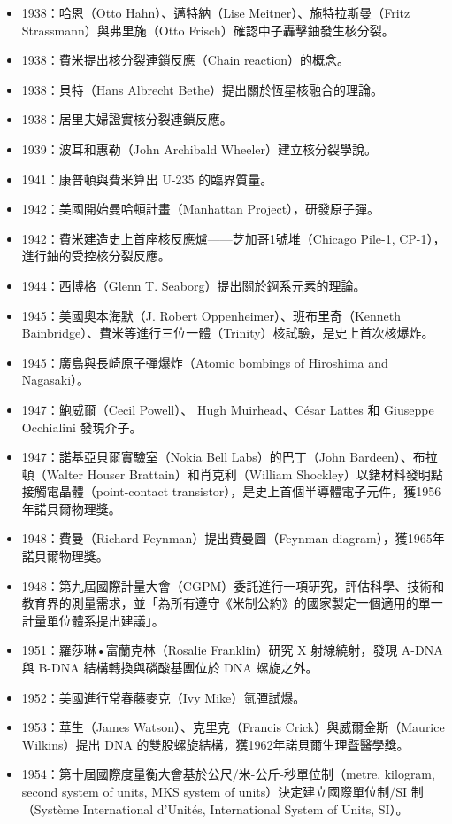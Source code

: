 \documentclass[a4paper,12pt]{article}
\begin{document}
\begin{itemize}
\item 1938：哈恩（Otto Hahn）、邁特納（Lise Meitner）、施特拉斯曼（Fritz Strassmann）與弗里施（Otto Frisch）確認中子轟擊鈾發生核分裂。
\item 1938：費米提出核分裂連鎖反應（Chain reaction）的概念。
\item 1938：貝特（Hans Albrecht Bethe）提出關於恆星核融合的理論。
\item 1938：居里夫婦證實核分裂連鎖反應。
\item 1939：波耳和惠勒（John Archibald Wheeler）建立核分裂學說。
\item 1941：康普頓與費米算出 U-235 的臨界質量。
\item 1942：美國開始曼哈頓計畫（Manhattan Project），研發原子彈。
\item 1942：費米建造史上首座核反應爐——芝加哥1號堆（Chicago Pile-1, CP-1），進行鈾的受控核分裂反應。
\item 1944：西博格（Glenn T. Seaborg）提出關於錒系元素的理論。
\item 1945：美國奧本海默（J. Robert Oppenheimer）、班布里奇（Kenneth Bainbridge）、費米等進行三位一體（Trinity）核試驗，是史上首次核爆炸。
\item 1945：廣島與長崎原子彈爆炸（Atomic bombings of Hiroshima and Nagasaki）。
\item 1947：鮑威爾（Cecil Powell）、 Hugh Muirhead、César Lattes 和 Giuseppe Occhialini 發現介子。
\item 1947：諾基亞貝爾實驗室（Nokia Bell Labs）的巴丁（John Bardeen）、布拉頓（Walter Houser Brattain）和肖克利（William Shockley）以鍺材料發明點接觸電晶體（point-contact transistor），是史上首個半導體電子元件，獲1956年諾貝爾物理獎。
\item 1948：費曼（Richard Feynman）提出費曼圖（Feynman diagram），獲1965年諾貝爾物理獎。
\item 1948：第九屆國際計量大會（CGPM）委託進行一項研究，評估科學、技術和教育界的測量需求，並「為所有遵守《米制公約》的國家製定一個適用的單一計量單位體系提出建議」。
\item 1951：羅莎琳•富蘭克林（Rosalie Franklin）研究 X 射線繞射，發現 A-DNA 與 B-DNA 結構轉換與磷酸基團位於 DNA 螺旋之外。
\item 1952：美國進行常春藤麥克（Ivy Mike）氫彈試爆。
\item 1953：華生（James Watson）、克里克（Francis Crick）與威爾金斯（Maurice Wilkins）提出 DNA 的雙股螺旋結構，獲1962年諾貝爾生理暨醫學獎。
\item 1954：第十屆國際度量衡大會基於公尺/米-公斤-秒單位制（metre, kilogram, second system of units, MKS system of units）決定建立國際單位制/SI 制（Système International d'Unités, International System of Units, SI）。

\end{itemize}
\end{document}
